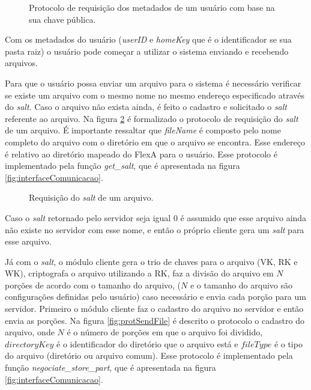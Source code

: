         \begin{figure}[!ht]
        
        
        \caption{Protocolo de requisição dos metadados de um usuário com base na sua chave pública.}
        \label{fig:protMetadadosUsuario}
        \end{figure}
        
        Com os metadados do usuário (\textit{userID} e \textit{homeKey} que é o identificador se sua pasta raiz) o usuário pode começar a utilizar o sistema enviando e recebendo arquivos.
        
        Para que o usuário possa enviar um arquivo para o sistema é necessário verificar se existe um arquivo com o mesmo nome no mesmo endereço especificado através do \textit{salt}. Caso o arquivo não exista ainda, é feito o cadastro e solicitado o \textit{salt} referente ao arquivo. Na figura \ref{fig:protGetSalt} é formalizado o protocolo de requisição do \textit{salt} de um arquivo. É importante ressaltar que \textit{fileName} é composto pelo nome completo do arquivo com o diretório em que o arquivo se encontra. Esse endereço é relativo ao diretório mapeado do FlexA para o usuário. Esse protocolo é implementado pela função \textit{get\_salt}, que é apresentada na figura \ref{fig:interfaceComunicacao}.

        \begin{figure}[!ht]
        \caption{Requisição do \textit{salt} de um arquivo.}
        \label{fig:protGetSalt}
        \end{figure}
        
        Caso o \textit{salt} retornado pelo servidor seja igual $0$ é assumido que esse arquivo ainda não existe no servidor com esse nome, e então o próprio cliente gera um \textit{salt} para esse arquivo.
        
        Já com o \textit{salt}, o módulo cliente gera o trio de chaves para o arquivo (VK, RK e WK), criptografa o arquivo utilizando a RK, faz a divisão do arquivo em $N$ porções de acordo com o tamanho do arquivo, ($N$ e o tamanho do arquivo são configurações definidas pelo usuário) caso necessário e envia cada porção para um servidor. Primeiro o módulo cliente faz o cadastro do arquivo no servidor e então envia as porções. Na figura \ref{fig:protSendFile} é descrito o protocolo o cadastro do arquivo, onde $N$ é o número de porções em que o arquivo foi dividido, $directoryKey$ é o identificador do diretório que o arquivo está e $fileType$ é o tipo do arquivo (diretório ou arquivo comum). Esse protocolo é implementado pela função \textit{negociate\_store\_part}, que é apresentada na figura \ref{fig:interfaceComunicacao}.
        
